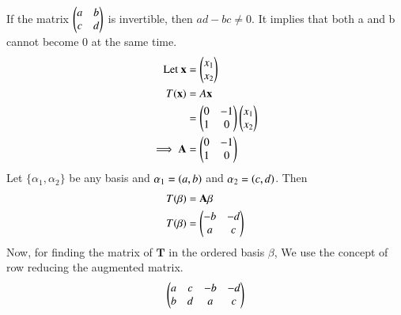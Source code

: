 If the matrix $\begin{pmatrix}a & b \\ c & d\end{pmatrix}$ is invertible, then $ad-bc \neq 0$. It implies that both a and b cannot become 0 at the same time.
\begin{align}
    \text{Let } \mathbf{x} &= \begin{pmatrix}x_1 \\ x_2\end{pmatrix} \\
    T(\mathbf{x}) &= A\mathbf{x}\\
     &= \begin{pmatrix}0 & -1 \\ 1 & 0\end{pmatrix}\begin{pmatrix}x_1 \\ x_2\end{pmatrix}\\
     \implies \mathbf{A} &= \begin{pmatrix}0 & -1 \\ 1 & 0\end{pmatrix}
\end{align}
Let $\{\alpha_1,\alpha_2\}$ be any basis and $\alpha_1=\left(a,b\right)$ and $\alpha_2=\left(c,d\right)$. Then 
\begin{align}
    T(\beta) &= \mathbf{A}\beta\\ 
    T(\beta) &= \begin{pmatrix}-b & -d \\ a & c\end{pmatrix} 
\end{align}
Now, for finding the matrix of $\mathbf{T}$ in the ordered basis $\beta$, We use the concept of row reducing the augmented matrix.
\begin{align}
    \begin{pmatrix}a & c & -b & -d \\ b & d & a & c\end{pmatrix}
\end{align}
